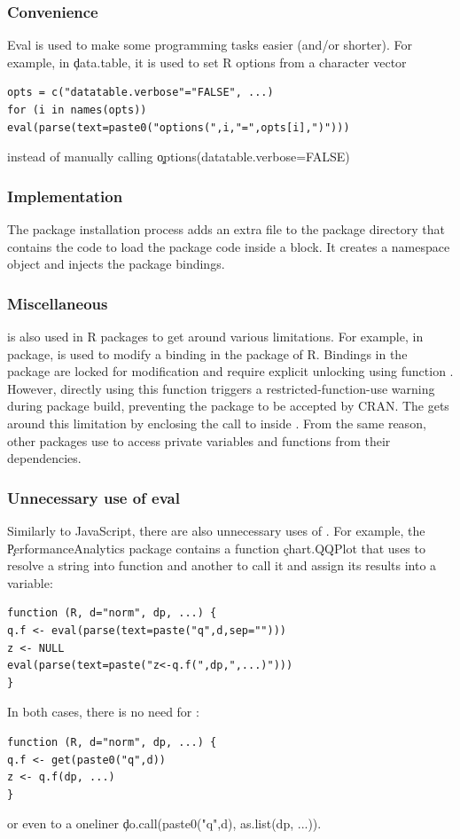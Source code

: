 \documentclass[conference]{IEEEtran}
\begin{document}
  \subsubsection{Convenience} Eval is used to make some programming tasks easier (and/or shorter). For example, in \c{data.table}, it is used to set R options from a character vector
  \begin{lstlisting}
opts = c("datatable.verbose"="FALSE", ...)
for (i in names(opts)) eval(parse(text=paste0("options(",i,"=",opts[i],")")))

  \end{lstlisting}
  instead of manually calling \c{options(datatable.verbose=FALSE)}

  \subsubsection{Implementation}
  The package installation process adds an extra file to the package directory
  that contains the code to load the package code inside a \local block. It
  creates a namespace object and injects the package bindings.

  \subsubsection{Miscellaneous} \eval is also used in R packages to get around
  various limitations. For example, in \datatable package, \eval is used to
  modify a binding in the \base package of R. Bindings in the \base package are
  locked for modification and require explicit unlocking using 
  function \unlockBinding. However, directly using this function triggers a
  restricted-function-use warning during package build, preventing the package
  to be accepted by CRAN. The \datatable gets around this limitation by
  enclosing the call to \unlockBinding inside \eval. From the same reason, other
  packages use \eval to access private variables and functions from their
  dependencies.

  \subsubsection{Unnecessary use of eval} Similarly to JavaScript, there are also unnecessary uses of \eval.
  For example, the \c{PerformanceAnalytics} package contains a function \c{chart.QQPlot} that uses \eval to resolve a string into function and another to call it and assign its results into a variable:
  \begin{lstlisting}
function (R, d="norm", dp, ...) {
q.f <- eval(parse(text=paste("q",d,sep="")))
z <- NULL
eval(parse(text=paste("z<-q.f(",dp,",...)")))
}
  \end{lstlisting}
  In both cases, there is no need for \eval:
  \begin{lstlisting}
function (R, d="norm", dp, ...) {
q.f <- get(paste0("q",d))
z <- q.f(dp, ...)
}
  \end{lstlisting}
  or even to a oneliner \c{do.call(paste0("q",d), as.list(dp, ...))}.
\end{document}
